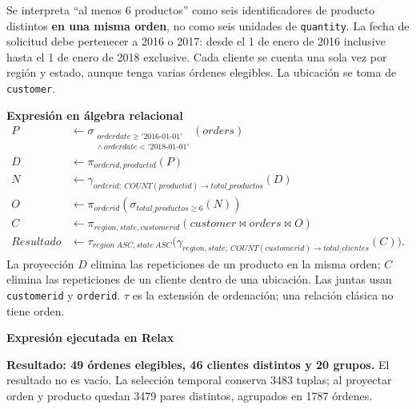 Se interpreta ``al menos 6 productos'' como seis identificadores de producto distintos \textbf{en una misma orden}, no como seis unidades de \texttt{quantity}. La fecha de solicitud debe pertenecer a 2016 o 2017: desde el 1 de enero de 2016 inclusive hasta el 1 de enero de 2018 exclusive. Cada cliente se cuenta una sola vez por región y estado, aunque tenga varias órdenes elegibles. La ubicación se toma de \texttt{customer}.

\textbf{Expresión en álgebra relacional}
\begin{align*}
P &\leftarrow \sigma_{\substack{orderdate\geq '2016\text{-}01\text{-}01'\\\land\,orderdate<'2018\text{-}01\text{-}01'}}(orders)\\
D &\leftarrow \pi_{orderid,productid}(P)\\
N &\leftarrow \gamma_{orderid;\ COUNT(productid)\to total\_productos}(D)\\
O &\leftarrow \pi_{orderid}(\sigma_{total\_productos\geq6}(N))\\
C &\leftarrow \pi_{region,state,customerid}(customer\bowtie orders\bowtie O)\\
Resultado &\leftarrow \tau_{region\ ASC,state\ ASC}\bigl(\gamma_{region,state;\ COUNT(customerid)\to total\_clientes}(C)\bigr).
\end{align*}
La proyección $D$ elimina las repeticiones de un producto en la misma orden; $C$ elimina las repeticiones de un cliente dentro de una ubicación. Las juntas usan \texttt{customerid} y \texttt{orderid}. $\tau$ es la extensión de ordenación; una relación clásica no tiene orden.

\textbf{Expresión ejecutada en Relax}

\textbf{Resultado: 49 órdenes elegibles, 46 clientes distintos y 20 grupos.} El resultado no es vacío. La selección temporal conserva 3483 tuplas; al proyectar orden y producto quedan 3479 pares distintos, agrupados en 1787 órdenes.

\clearpage

